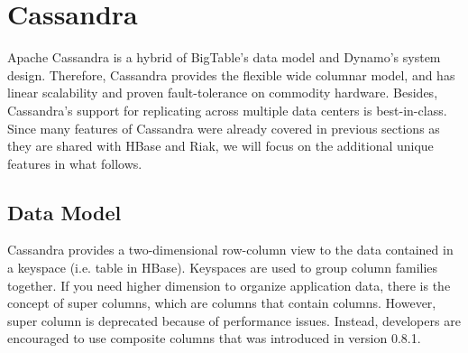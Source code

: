 \documentclass[11pt]{book}
\begin{document}
\section[Cassandra]
{Cassandra}
Apache Cassandra \cite{Lakshman:2010:CDS, Cassandra} is a hybrid of BigTable's data model and Dynamo's system design. Therefore, Cassandra provides the flexible wide columnar model, and has linear scalability and proven fault-tolerance on commodity hardware. Besides, Cassandra's support for replicating across multiple data centers is best-in-class. Since many features of Cassandra were already covered in previous sections as they are shared with HBase and Riak, we will focus on the additional unique features in what follows.

\subsection{Data Model}

Cassandra provides a two-dimensional row-column view to the data contained in a keyspace (i.e. table in HBase). Keyspaces are used to group column families together. If you need higher dimension to organize application data, there is the concept of super columns, which are columns that contain columns. However, super column is deprecated because of performance issues. Instead, developers are encouraged to use composite columns that was introduced in version 0.8.1. 
\end{document}
